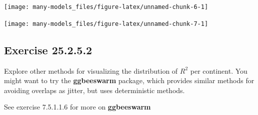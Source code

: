 \documentclass[]{book}
\newenvironment{Shaded}{\begin{snugshade}}{\end{snugshade}}
\newcommand{\DataTypeTok}[1]{\textcolor[rgb]{0.13,0.29,0.53}{#1}}
\newcommand{\FloatTok}[1]{\textcolor[rgb]{0.00,0.00,0.81}{#1}}
\newcommand{\KeywordTok}[1]{\textcolor[rgb]{0.13,0.29,0.53}{\textbf{#1}}}
\newcommand{\NormalTok}[1]{#1}
\newcommand{\OperatorTok}[1]{\textcolor[rgb]{0.81,0.36,0.00}{\textbf{#1}}}
\newcommand{\OtherTok}[1]{\textcolor[rgb]{0.56,0.35,0.01}{#1}}
\newcommand{\StringTok}[1]{\textcolor[rgb]{0.31,0.60,0.02}{#1}}
\theoremstyle{plain}
\theoremstyle{remark}
\begin{document}
\begin{center}\texttt{[image: many-models\_files/figure-latex/unnamed-chunk-6-1]} \end{center}

\begin{Shaded}
\end{Shaded}

\begin{center}\texttt{[image: many-models\_files/figure-latex/unnamed-chunk-7-1]} \end{center}

\hypertarget{exercise-25.2.5.2}{%
\subsection*{\texorpdfstring{Exercise {25.2.5.2}}{Exercise 25.2.5.2}}\label{exercise-25.2.5.2}}

Explore other methods for visualizing the distribution of \(R^2\) per continent. You might want to try the \textbf{ggbeeswarm} package, which provides similar methods for avoiding overlaps as jitter, but uses deterministic methods.

See exercise 7.5.1.1.6 for more on \textbf{ggbeeswarm}

\begin{Shaded}
\end{Shaded}
\end{document}
